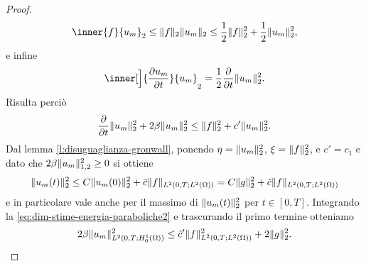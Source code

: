 \begin{proof}
    \begin{equation}
        \inner{f}{u_m}_2\le
        \norm{f}_2\norm{u_m}_2\le
        \frac12\norm{f}_2^2+\frac12\norm{u_m}_2^2,
    \end{equation}
    e infine
    \begin{equation}
        \inner[\Big]{\drp{u_m}{t}}{u_m}_2=
        \frac12\drp{}{t}\norm{u_m}_2^2.
    \end{equation}
    Risulta perciò
    \begin{equation}
        \drp{}{t}\norm{u_m}_2^2+2\beta\norm{u_m}_2^2\le\norm{f}_2^2+c'\norm{u_m}_2^2.
        \label{eq:dim-stime-energia-paraboliche2}
    \end{equation}
    Dal lemma \ref{l:disuguaglianza-gronwall}, ponendo $\eta=\norm{u_m}_2^2$, $\xi=\norm{f}_2^2$, e $c'=c_1$ e dato che $2\beta\norm{u_m}_{1,2}^2\ge 0$ si ottiene
    \begin{equation}
        \norm{u_m(t)}_2^2\le
        C\norm{u_m(0)}_2^2+\tilde{c}\norm{f}_{\leb[2]{0,T;\leb[2]{\Omega}}}=
        C\norm{g}_2^2+\tilde{c}\norm{f}_{\leb[2]{0,T;\leb[2]{\Omega}}}
    \end{equation}
    e in particolare vale anche per il massimo di $\norm{u_m(t)}_2^2$ per $t\in[0,T]$.
    Integrando la \eqref{eq:dim-stime-energia-paraboliche2} e trascurando il primo termine otteniamo
    \begin{equation}
        2\beta\norm{u_m}_{\leb[2]{0,T;\sobHc[1]{\Omega}}}^2\le\tilde{c}'\norm{f}_{\leb[2]{0,T;\leb[2]{\Omega}}}^2+2\norm{g}_2^2.
        \label{eq:dim-stime-energia-paraboliche3}
    \end{equation}


\end{proof}
